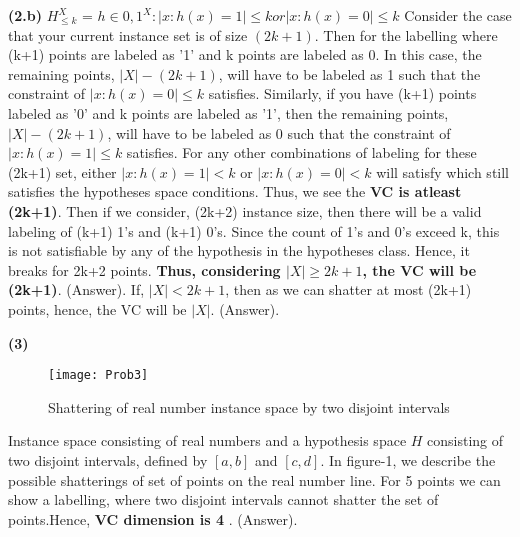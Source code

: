 \documentclass{article}
\renewcommand\part[1]{\vspace{.10in}\textbf{(#1)}}
\begin{document}
    \part{2.b}
    $H_{\leq k}^X$ = ${ h \in {0,1}^X : |{x:h(x)=1}| \leq k or |{x:h(x)=0}| \leq k}$ \newline
    Consider the case that your current instance set is of size $(2k+1)$. Then for the labelling where (k+1) points are labeled as '1' and k points are labeled as 0. In this case, the remaining points, $|X|-(2k+1)$, will have to be labeled as 1 such that the constraint of $|{x:h(x)=0}| \leq k$ satisfies. Similarly, if you have (k+1) points labeled as '0' and k points are labeled as '1', then the remaining points, $|X| - (2k+1)$, will have to be labeled as 0 such that the constraint of $|{x:h(x)=1}| \leq k$ satisfies. For any other combinations of labeling for these (2k+1) set, either $|{x:h(x)=1}| < k$ or $|{x:h(x)=0}| < k$ will satisfy which still satisfies the hypotheses space conditions. Thus, we see the \textbf {VC is atleast (2k+1)}. Then if we consider, (2k+2) instance size, then there will be a valid labeling of (k+1) 1's and (k+1) 0's. Since the count of 1's and 0's exceed k, this is not satisfiable by any of the hypothesis in the hypotheses class. Hence, it breaks for 2k+2 points. \textbf {Thus, considering $|X| \geq 2k+1$, the VC will be (2k+1)}. (Answer). \newline
    If, $|X| < 2k+1$, then as we can shatter at most (2k+1) points, hence, the VC will be $|X|$. (Answer). \newline


  \part{3}
  \begin{figure}[H]
   \centering
  \texttt{[image: Prob3]}
  \caption{Shattering of real number instance  space by two disjoint intervals}
  \end{figure}
  Instance space consisting of real numbers and a hypothesis space $H$ consisting of two disjoint intervals, defined by $[a,b]$ and $[c,d]$. \newline
  In figure-1, we describe the possible shatterings of set of points on the real number line. For 5 points we can show a labelling, where two disjoint intervals cannot shatter the set of points.Hence, \textbf {VC dimension is 4} . (Answer). \newline
\end{document}
